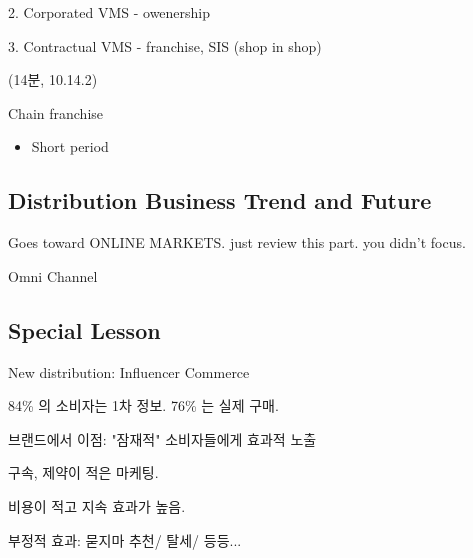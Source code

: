 \documentclass[12pt]{article}
\newcommand{\ra}{$\rightarrow \text{ }$}
\begin{document}

2. Corporated VMS - owenership

3. Contractual VMS - franchise, SIS (shop in shop)

(14분, 10.14.2)

Chain franchise

\begin{itemize}
	\item Short period
\end{itemize}

\subsection{Distribution Business Trend and Future}

Goes toward ONLINE MARKETS. just review this part. you didn't focus.

Omni Channel


\subsection{Special Lesson}

New distribution: Influencer Commerce

84\% 의 소비자는 1차 정보. 76\% 는 실제 구매.

브랜드에서 이점: "잠재적" 소비자들에게 효과적 노출

구속, 제약이 적은 마케팅.

비용이 적고 지속 효과가 높음.

부정적 효과:
묻지마 추천/ 탈세/ 등등...
\end{document}
